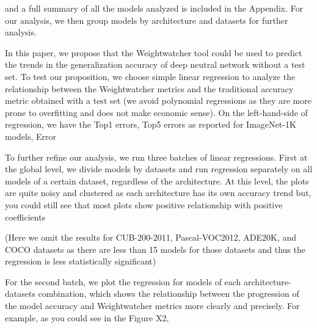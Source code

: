 
and a full summary of all the models analyzed is included in the Appendix. For our analysis, we then group models by architecture and datasets for further analysis.

In this paper, we propose that the Weightwatcher tool could be used to predict the trends in the generalization accuracy of deep neutral network without a test set. To test our proposition, we choose simple linear regression to analyze the relationship between the Weightwatcher metrics and the traditional accuracy metric obtained with a test set (we avoid polynomial regressions as they are more prone to overfitting and does not make economic sense). On the left-hand-side of regression, we have the Top1 errors, Top5 errors as reported for ImageNet-1K models, Error %



To further refine our analysis, we run three batches of linear regressions. First at the global level, we divide models by datasets and run regression separately on all models of a certain dataset, regardless of the architecture. At this level, the plots are quite noisy and clustered as each architecture has its own accuracy trend but, you could still see that most plots show positive relationship with positive coefficients


(Here we omit the results for CUB-200-2011, Pascal-VOC2012, ADE20K, and COCO datasets as there are less than 15 models for those datasets and thus the regression is less statistically significant)


For the second batch, we plot the regression for models of each architecture-datasets combination, which shows the relationship between the progression of the model accuracy and Weightwatcher metrics more clearly and precisely. For example, as you could see in the Figure X2, 

